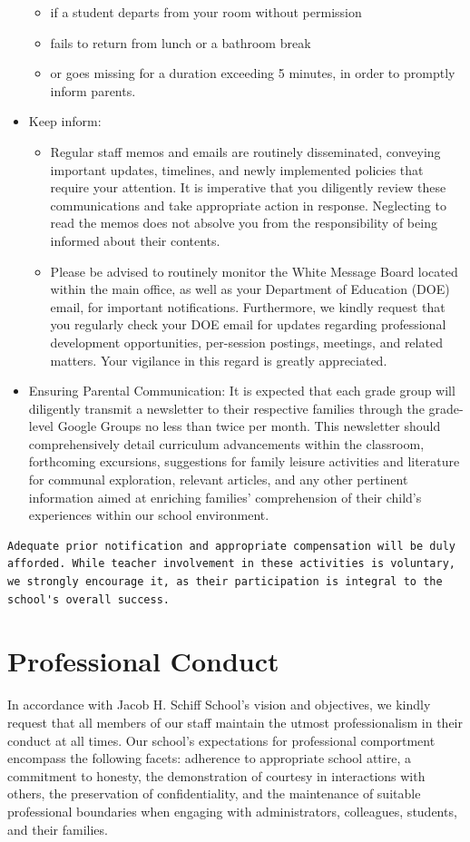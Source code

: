 \documentclass[11pt, letterpaper]{article}
\begin{document}
\begin{itemize}
\begin{itemize}
\item if a student departs from your room without permission
\item fails to return from lunch or a bathroom break
\item or goes missing for a duration exceeding 5 minutes, in order to promptly inform parents.
\end{itemize}
\item Keep inform:
\begin{itemize}
\item Regular staff memos and emails are routinely disseminated, conveying important updates, timelines, and newly implemented policies that require your attention. It is imperative that you diligently review these communications and take appropriate action in response. Neglecting to read the memos does not absolve you from the responsibility of being informed about their contents.
\item Please be advised to routinely monitor the White Message Board located within the main office, as well as your Department of Education (DOE) email, for important notifications. Furthermore, we kindly request that you regularly check your DOE email for updates regarding professional development opportunities, per-session postings, meetings, and related matters. Your vigilance in this regard is greatly appreciated.
\end{itemize}
\item Ensuring Parental Communication: It is expected that each grade group will diligently transmit a newsletter to their respective families through the grade-level Google Groups no less than twice per month. This newsletter should comprehensively detail curriculum advancements within the classroom, forthcoming excursions, suggestions for family leisure activities and literature for communal exploration, relevant articles, and any other pertinent information aimed at enriching families' comprehension of their child's experiences within our school environment.
\end{itemize}
\begin{Verbatim}[breaklines=true]
Adequate prior notification and appropriate compensation will be duly afforded. While teacher involvement in these activities is voluntary, we strongly encourage it, as their participation is integral to the school's overall success.
\end{Verbatim}
\section{Professional Conduct}
In accordance with Jacob H. Schiff School's vision and objectives, we kindly request that all members of our staff maintain the utmost professionalism in their conduct at all times. Our school's expectations for professional comportment encompass the following facets: adherence to appropriate school attire, a commitment to honesty, the demonstration of courtesy in interactions with others, the preservation of confidentiality, and the maintenance of suitable professional boundaries when engaging with administrators, colleagues, students, and their families.
\end{document}
